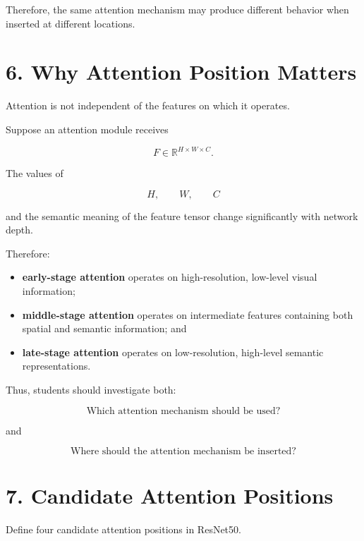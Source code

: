 \documentclass[10pt]{article}
\begin{document}
Therefore, the same attention mechanism may produce different behavior when
inserted at different locations.

\section*{6. Why Attention Position Matters}

Attention is not independent of the features on which it operates.

Suppose an attention module receives

\[
F\in\mathbb{R}^{H\times W\times C}.
\]

The values of

\[
H,\qquad W,\qquad C
\]

and the semantic meaning of the feature tensor change significantly with
network depth.

Therefore:

\begin{itemize}

\item \textbf{early-stage attention} operates on high-resolution,
low-level visual information;

\item \textbf{middle-stage attention} operates on intermediate features
containing both spatial and semantic information; and

\item \textbf{late-stage attention} operates on low-resolution,
high-level semantic representations.

\end{itemize}

Thus, students should investigate both:

\[
\boxed{\text{Which attention mechanism should be used?}}
\]

and

\[
\boxed{\text{Where should the attention mechanism be inserted?}}
\]

\section*{7. Candidate Attention Positions}

Define four candidate attention positions in ResNet50.
\end{document}
